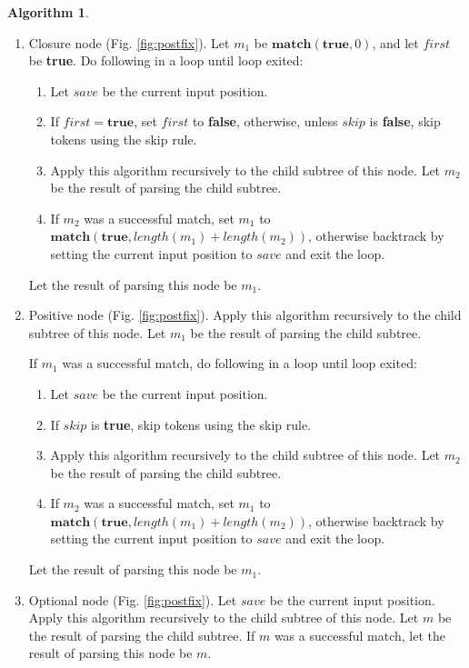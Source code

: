 \documentclass[a4paper,oneside,11pt]{book}
\theoremstyle{definition}
\newtheorem{algo}{Algorithm}[section]
\begin{document}
\begin{algo}
\begin{flushleft}
\begin{enumerate}
\item
Closure node (Fig. \ref{fig:postfix}). Let $m_1$ be $\textbf{match}(\textbf{true},0)$, and let $first$ be \textbf{true}.
Do following in a loop until loop exited:

\begin{enumerate}
\item
Let $save$ be the current input position.
\item
If $first = \textbf{true}$, set $first$ to \textbf{false}, otherwise, unless $skip$ is \textbf{false}, skip tokens using the skip rule.
\item
Apply this algorithm recursively to the child subtree of this node.
Let $m_2$ be the result of parsing the child subtree.
\item
If $m_2$ was a successful match, set $m_1$ to $\textbf{match}(\textbf{true}, length(m_1) + length(m_2))$,
otherwise backtrack by setting the current input position to $save$ and exit the loop.
\end{enumerate}
Let the result of parsing this node be $m_1$.

\item
Positive node (Fig. \ref{fig:postfix}). Apply this algorithm recursively to the child subtree of this node.
Let $m_1$ be the result of parsing the child subtree.

If $m_1$ was a successful match, do following in a loop until loop exited:
\begin{enumerate}
\item
Let $save$ be the current input position.
\item
If $skip$ is \textbf{true}, skip tokens using the skip rule.
\item
Apply this algorithm recursively to the child subtree of this node.
Let $m_2$ be the result of parsing the child subtree.
\item
If $m_2$ was a successful match, set $m_1$ to $\textbf{match}(\textbf{true}, length(m_1) + length(m_2))$,
otherwise backtrack by setting the current input position to $save$ and exit the loop.
\end{enumerate}
Let the result of parsing this node be $m_1$.

\item
Optional node (Fig. \ref{fig:postfix}). Let $save$ be the current input position.
Apply this algorithm recursively to the child subtree of this node.
Let $m$ be the result of parsing the child subtree.
If $m$ was a successful match, let the result of parsing this node be $m$.


\end{enumerate}
\end{flushleft}
\end{algo}
\end{document}

